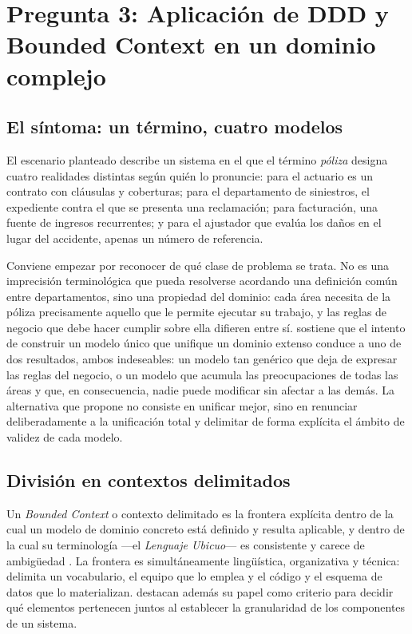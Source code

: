 \section{Pregunta 3: Aplicación de DDD y Bounded Context en un dominio complejo}


\subsection*{El síntoma: un término, cuatro modelos}

El escenario planteado describe un sistema en el que el término \emph{póliza} designa cuatro
realidades distintas según quién lo pronuncie: para el actuario es un contrato con cláusulas y
coberturas; para el departamento de siniestros, el expediente contra el que se presenta una
reclamación; para facturación, una fuente de ingresos recurrentes; y para el ajustador que evalúa
los daños en el lugar del accidente, apenas un número de referencia.

Conviene empezar por reconocer de qué clase de problema se trata. No es una imprecisión
terminológica que pueda resolverse acordando una definición común entre departamentos, sino una
propiedad del dominio: cada área necesita de la póliza precisamente aquello que le permite ejecutar
su trabajo, y las reglas de negocio que debe hacer cumplir sobre ella difieren entre sí.
\textcite{evans2003} sostiene que el intento de construir un modelo único que unifique un dominio
extenso conduce a uno de dos resultados, ambos indeseables: un modelo tan genérico que deja de
expresar las reglas del negocio, o un modelo que acumula las preocupaciones de todas las áreas y
que, en consecuencia, nadie puede modificar sin afectar a las demás. La alternativa que propone no
consiste en unificar mejor, sino en renunciar deliberadamente a la unificación total y delimitar de
forma explícita el ámbito de validez de cada modelo.

\subsection*{División en contextos delimitados}

Un \emph{Bounded Context} o contexto delimitado es la frontera explícita dentro de la cual un
modelo de dominio concreto está definido y resulta aplicable, y dentro de la cual su terminología
---el \emph{Lenguaje Ubicuo}--- es consistente y carece de ambigüedad \parencite{evans2003}. La
frontera es simultáneamente lingüística, organizativa y técnica: delimita un vocabulario, el equipo
que lo emplea y el código y el esquema de datos que lo materializan.
\textcite{richardsford2020} destacan además su papel como criterio para decidir qué elementos
pertenecen juntos al establecer la granularidad de los componentes de un sistema.

